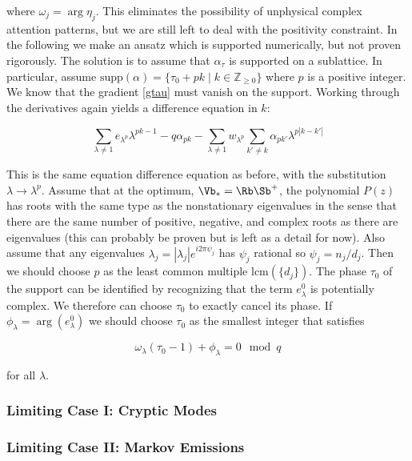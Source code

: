 \documentclass{article}
\begin{document}
where $\omega_j = \arg\eta_j$. This eliminates the possibility of unphysical complex attention patterns, but we are still left to deal with the positivity constraint. In the following we make an ansatz which is supported numerically, but not proven rigorously. The solution is to assume that $\alpha_\tau$ is supported on a sublattice. In particular, assume $\textrm{supp}(\alpha)= \{\tau_0 + pk \mid k \in \mathbb{Z}_{\ge0}\}$ where $p$ is a positive integer. We know that the gradient \eqref{gtau} must vanish on the support. Working through the derivatives again yields a difference equation in $k$:

\begin{equation}
    \sum_{\lambda \neq 1}e_{\lambda^p} \lambda^{pk -1} - q\alpha_{pk} - \sum_{\lambda\neq1}w_{\lambda^p} \sum_{k' \neq k}\alpha_{pk'} \lambda^{p|k - k'|}
\end{equation}

This is the same equation difference equation as before, with the substitution $\lambda \to \lambda^p$. Assume that at the optimum, $\Vb_\ast = \Rb \Sb^+$, the polynomial $P(z)$ has roots with the same type as the nonstationary eigenvalues in the sense that there are the same number of positive, negative, and complex roots as there are eigenvalues (this can probably be proven but is left as a detail for now). Also assume that any eigenvalues $\lambda_j = |\lambda_j|e^{i2\pi\psi_j}$ has $\psi_j$ rational so $\psi_j = n_j/d_j$. Then we should choose $p$ as the least common multiple $\text{lcm}(\{d_j\})$. The phase $\tau_0$ of the support can be identified by recognizing that the term $e_\lambda^0$ is potentially complex. We therefore can choose $\tau_0$ to exactly cancel its phase. If $\phi_\lambda = \arg(e_\lambda^0)$ we should choose $\tau_0$ as the smallest integer that satisfies

\begin{equation}
    \omega_\lambda(\tau_0-1) + \phi_\lambda = 0 \mod q
\end{equation}

for all $\lambda$. 

\subsubsection{Limiting Case I: Cryptic Modes}

\subsubsection{Limiting Case II: Markov Emissions}
\end{document}
